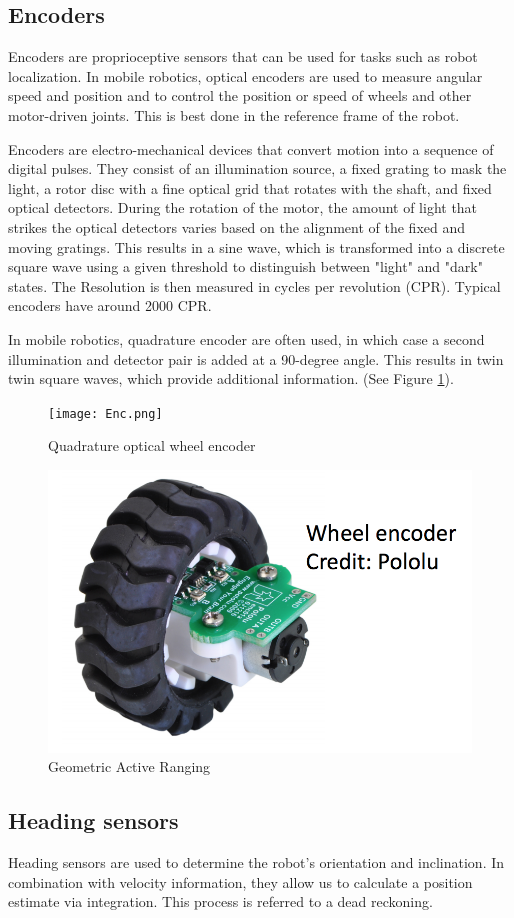 \subsection{Encoders}
Encoders are proprioceptive sensors that can be used for tasks such as robot localization. In mobile robotics, optical encoders are used to measure angular speed and position and to control the position or speed of wheels and other motor-driven joints. This is best done in the reference frame of the robot.

Encoders are electro-mechanical devices that convert motion into a sequence of digital pulses. They consist of an illumination source, a fixed grating to mask the light, a rotor disc with a fine optical grid that rotates with the shaft, and fixed optical detectors. During the rotation of the motor, the amount of light that strikes the optical detectors varies based on the alignment of the fixed and moving gratings. This results in a sine wave, which is transformed into a discrete square wave using a given threshold to distinguish between "light" and "dark" states. The Resolution is then measured in cycles per revolution (CPR). Typical encoders have around 2000 CPR.

In mobile robotics, quadrature encoder are often used, in which case a second illumination and detector pair is added at a 90-degree angle. This results in twin twin square waves, which provide additional information. (See Figure \ref{fig:encoder}).

\begin{figure}[H]
\centering
        \texttt{[image: Enc.png]}
        \caption{Quadrature optical wheel encoder \cite{SNS}}
        \label{fig:encoder}
\end{figure}

\begin{figure}[H]
\centering
        \includegraphics[width =5 cm]{lecture_4/imgs/encoder2.png}
        \caption{Geometric Active Ranging}
\end{figure}



\subsection{Heading sensors}
Heading sensors are used to determine the robot’s orientation and inclination. In combination with velocity information, they allow us to calculate a position estimate via integration. This process is referred to a dead reckoning.
